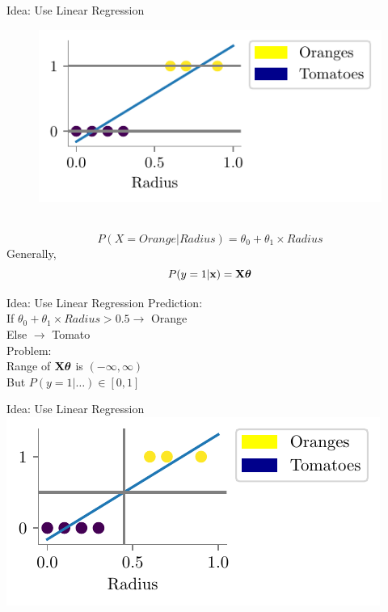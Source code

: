 \documentclass{beamer}
\begin{document}
\begin{frame}{Idea: Use Linear Regression}
\hspace{2.5cm}
\begin{minipage}{0.3\textwidth}
	
	\begin{figure}
		
		\includegraphics{../assets/logistic-regression/figures/linear-orange-tomatoes.pdf}
	\end{figure}
\end{minipage} \\
\begin{equation*}
P(X = Orange | Radius) = \theta_{0} + \theta_{1} \times Radius
\end{equation*}
\pause Generally,
\begin{equation*}
P(y = 1 | \mathbf{x}) = \mathbf{X}\boldsymbol{\theta}
\end{equation*}
\end{frame}
\begin{frame}{Idea: Use Linear Regression}
Prediction:\\
If $\theta_{0} + \theta_{1}\times Radius > 0.5 \rightarrow$ Orange \\
\hspace{3.3cm} Else $\rightarrow$ Tomato\\
Problem:\\
Range of $\mathbf{X}\boldsymbol{\theta}$ is $(-\infty, \infty)$\\
But $P(y = 1 | \ldots) \in [0, 1]$
\end{frame}

\begin{frame}{Idea: Use Linear Regression}
\includegraphics{../assets/logistic-regression/figures/linear-orange-tomatoes-decision.pdf}
\end{frame}
\end{document}
